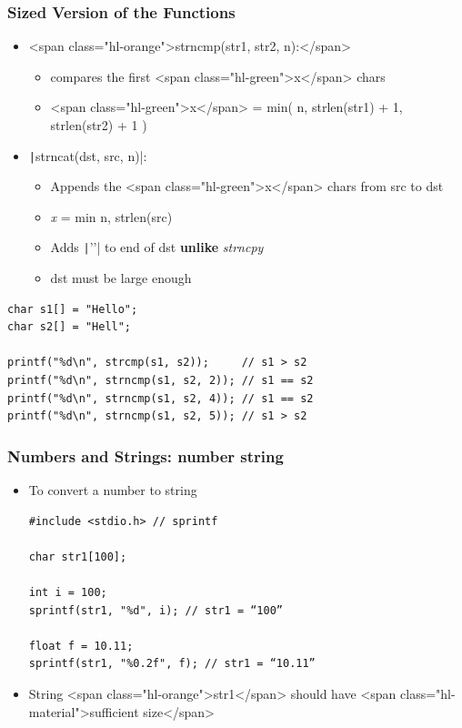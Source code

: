 \documentclass{../c-lecture}
\begin{document}
\begin{frame}
  \frametitle{Sized Version of the Functions}
  \begin{itemize}
    \item <span class="hl-orange">strncmp(str1, str2, n):</span>
    \begin{itemize}
      \item compares the first <span class="hl-green">x</span> chars
      \item
        <span class="hl-green">x</span> = min( n, strlen(str1) + 1,
        strlen(str2) + 1 )

    \end{itemize}
    \item \texttt|strncat(dst, src, n)|:
    \begin{itemize}
      \item
        Appends the <span class="hl-green">x</span> chars from src to dst

      \item \textit{\color{RubineRed} x} = min{ n, strlen(src) }
      \item
        Adds \texttt|'\0'| to end of dst \textbf{\color{RubineRed} unlike}
        \textit{\color{Cyan} strncpy}

      \item dst must be large enough
    \end{itemize}
  \end{itemize}
\end{frame}

\begin{frame}[fragile]
  \begin{verbatim}
char s1[] = "Hello";
char s2[] = "Hell";

printf("%d\n", strcmp(s1, s2));     // s1 > s2
printf("%d\n", strncmp(s1, s2, 2)); // s1 == s2
printf("%d\n", strncmp(s1, s2, 4)); // s1 == s2
printf("%d\n", strncmp(s1, s2, 5)); // s1 > s2
  \end{verbatim}
\end{frame}

\begin{frame}[fragile]
  \frametitle{Numbers and Strings: number \textrightarrow string}
  \begin{itemize}
    \item To convert a number to string
    \begin{verbatim}
#include <stdio.h> // sprintf

char str1[100];

int i = 100;
sprintf(str1, "%d", i); // str1 = “100”

float f = 10.11;
sprintf(str1, "%0.2f", f); // str1 = “10.11”

    \end{verbatim}
    \item
      String <span class="hl-orange">str1</span> should have
      <span class="hl-material">sufficient size</span>

  \end{itemize}
\end{frame}
\end{document}
